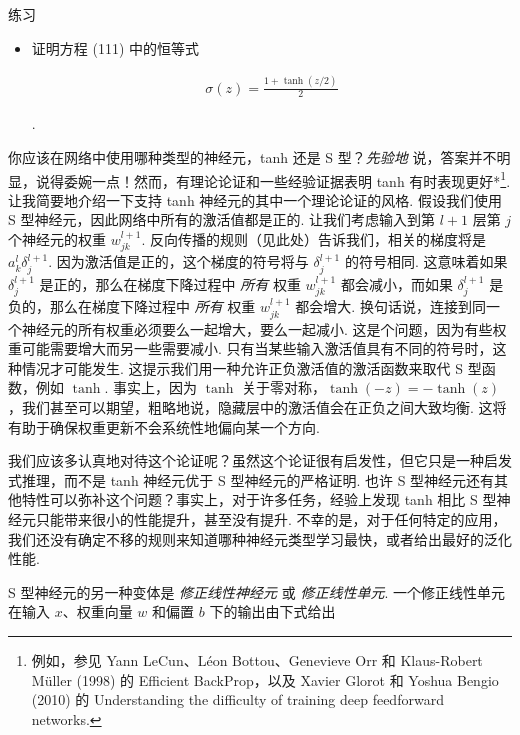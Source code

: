 \begin{exerciseBox}{练习}

\begin{itemize}

\item
证明方程 (111) 中的恒等式

\begin{align*}
\sigma(z) = \frac{1+\tanh(z/2)}{2} \nonumber
\end{align*}

.

\end{itemize}

你应该在网络中使用哪种类型的神经元，tanh 还是 S 型？\emph{先验地} 说，答案并不明显，说得委婉一点！然而，有理论论证和一些经验证据表明 tanh 有时表现更好*\footnote{例如，参见 Yann LeCun、Léon Bottou、Genevieve Orr 和 Klaus-Robert Müller (1998) 的 Efficient BackProp，以及 Xavier Glorot 和 Yoshua Bengio (2010) 的 Understanding the difficulty of training deep feedforward networks.}. 让我简要地介绍一下支持 tanh 神经元的其中一个理论论证的风格. 假设我们使用 S 型神经元，因此网络中所有的激活值都是正的. 让我们考虑输入到第 $l+1$ 层第 $j$ 个神经元的权重 $w^{l+1}_{jk}$. 反向传播的规则（见此处）告诉我们，相关的梯度将是 $a^l_k \delta^{l+1}_j$. 因为激活值是正的，这个梯度的符号将与 $\delta^{l+1}_j$ 的符号相同. 这意味着如果 $\delta^{l+1}_j$ 是正的，那么在梯度下降过程中 \emph{所有} 权重 $w^{l+1}_{jk}$ 都会减小，而如果 $\delta^{l+1}_j$ 是负的，那么在梯度下降过程中 \emph{所有} 权重 $w^{l+1}_{jk}$ 都会增大. 换句话说，连接到同一个神经元的所有权重必须要么一起增大，要么一起减小. 这是个问题，因为有些权重可能需要增大而另一些需要减小. 只有当某些输入激活值具有不同的符号时，这种情况才可能发生. 这提示我们用一种允许正负激活值的激活函数来取代 S 型函数，例如 $\tanh$. 事实上，因为 $\tanh$ 关于零对称，$\tanh(-z) = -\tanh(z)$，我们甚至可以期望，粗略地说，隐藏层中的激活值会在正负之间大致均衡. 这将有助于确保权重更新不会系统性地偏向某一个方向.

我们应该多认真地对待这个论证呢？虽然这个论证很有启发性，但它只是一种启发式推理，而不是 tanh 神经元优于 S 型神经元的严格证明. 也许 S 型神经元还有其他特性可以弥补这个问题？事实上，对于许多任务，经验上发现 tanh 相比 S 型神经元只能带来很小的性能提升，甚至没有提升. 不幸的是，对于任何特定的应用，我们还没有确定不移的规则来知道哪种神经元类型学习最快，或者给出最好的泛化性能.

S 型神经元的另一种变体是 \emph{修正线性神经元} 或 \emph{修正线性单元}. 一个修正线性单元在输入 $x$、权重向量 $w$ 和偏置 $b$ 下的输出由下式给出


\end{exerciseBox}
